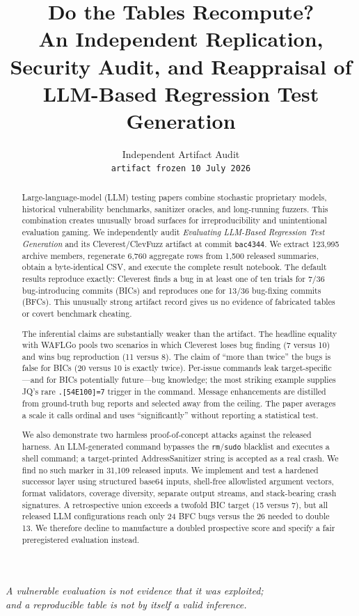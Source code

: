 \documentclass{article}
\title{Do the Tables Recompute?\\
An Independent Replication, Security Audit, and Reappraisal of\\
LLM-Based Regression Test Generation}
\author{Independent Artifact Audit\\
\texttt{artifact frozen 10 July 2026}}
\begin{document}
\maketitle

\begin{center}
\textit{A vulnerable evaluation is not evidence that it was exploited;\\
and a reproducible table is not by itself a valid inference.}
\end{center}

\begin{abstract}
Large-language-model (LLM) testing papers combine stochastic proprietary models,
historical vulnerability benchmarks, sanitizer oracles, and long-running fuzzers.
This combination creates unusually broad surfaces for irreproducibility and
unintentional evaluation gaming.  We independently audit \emph{Evaluating
LLM-Based Regression Test Generation} and its Cleverest/ClevFuzz artifact at
commit \texttt{bac4344}.  We extract 123,995 archive members, regenerate 6,760
aggregate rows from 1,500 released summaries, obtain a byte-identical CSV, and
execute the complete result notebook.  The default results reproduce exactly:
Cleverest finds a bug in at least one of ten trials for 7/36 bug-introducing
commits (BICs) and reproduces one for 13/36 bug-fixing commits (BFCs).
This unusually strong artifact record gives us no evidence of fabricated tables
or covert benchmark cheating.

The inferential claims are substantially weaker than the artifact.  The
headline equality with WAFLGo pools two scenarios in which Cleverest loses
bug finding (7 versus 10) and wins bug reproduction (11 versus 8).  The claim
of ``more than twice'' the bugs is false for BICs (20 versus 10 is exactly
twice).  Per-issue commands leak target-specific---and for BICs potentially
future---bug knowledge; the most striking example supplies JQ's rare
\texttt{.[54E100]=7} trigger in the command.  Message enhancements are distilled
from ground-truth bug reports and selected away from the ceiling.  The paper
averages a scale it calls ordinal and uses ``significantly'' without reporting
a statistical test.

We also demonstrate two harmless proof-of-concept attacks against the released
harness.  An LLM-generated command bypasses the \texttt{rm}/\texttt{sudo}
blacklist and executes a shell command; a target-printed AddressSanitizer string
is accepted as a real crash.  We find no such marker in 31,109 released inputs.
We implement and test a hardened successor layer using structured base64 inputs,
shell-free allowlisted argument vectors, format validators, coverage diversity,
separate output streams, and stack-bearing crash signatures.  A retrospective
union exceeds a twofold BIC target (15 versus 7), but all released LLM
configurations reach only 24 BFC bugs versus the 26 needed to double 13.
We therefore decline to manufacture a doubled prospective score and specify a
fair preregistered evaluation instead.
\end{abstract}
\end{document}
